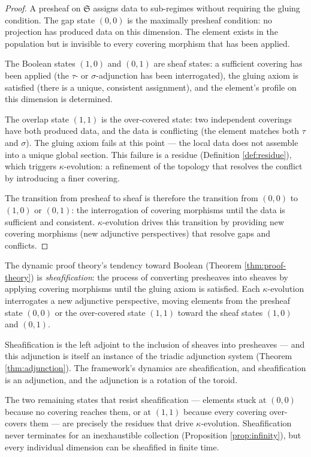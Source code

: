 \begin{proof}
A presheaf on $\mathfrak{S}$ assigns data to sub-regimes
without requiring the gluing condition. The gap state
$(0,0)$ is the maximally presheaf condition: no projection
has produced data on this dimension. The element exists in
the population but is invisible to every covering morphism
that has been applied.

The Boolean states $(1,0)$ and $(0,1)$ are sheaf states:
a sufficient covering has been applied (the $\tau$- or
$\sigma$-adjunction has been interrogated), the gluing
axiom is satisfied (there is a unique, consistent
assignment), and the element's profile on this dimension
is determined.

The overlap state $(1,1)$ is the over-covered state: two
independent coverings have both produced data, and the
data is conflicting (the element matches both $\tau$ and
$\sigma$). The gluing axiom fails at this point --- the
local data does not assemble into a unique global section.
This failure is a residue (Definition \ref{def:residue}),
which triggers $\kappa$-evolution: a refinement of the
topology that resolves the conflict by introducing a
finer covering.

The transition from presheaf to sheaf is therefore the
transition from $(0,0)$ to $(1,0)$ or $(0,1)$: the
interrogation of covering morphisms until the data is
sufficient and consistent. $\kappa$-evolution drives this
transition by providing new covering morphisms (new
adjunctive perspectives) that resolve gaps and conflicts.
\end{proof}

\begin{remark}
The dynamic proof theory's tendency toward Boolean
(Theorem \ref{thm:proof-theory}) is \emph{sheafification}:
the process of converting presheaves into sheaves by
applying covering morphisms until the gluing axiom is
satisfied. Each $\kappa$-evolution interrogates a new
adjunctive perspective, moving elements from the presheaf
state $(0,0)$ or the over-covered state $(1,1)$ toward
the sheaf states $(1,0)$ and $(0,1)$.

Sheafification is the left adjoint to the inclusion of
sheaves into presheaves --- and this adjunction is itself
an instance of the triadic adjunction system
(Theorem \ref{thm:adjunction}). The framework's dynamics
are sheafification, and sheafification is an adjunction,
and the adjunction is a rotation of the toroid.

The two remaining states that resist sheafification ---
elements stuck at $(0,0)$ because no covering reaches
them, or at $(1,1)$ because every covering over-covers
them --- are precisely the residues that drive
$\kappa$-evolution. Sheafification never terminates for
an inexhaustible collection (Proposition
\ref{prop:infinity}), but every individual dimension
can be sheafified in finite time.
\end{remark}

